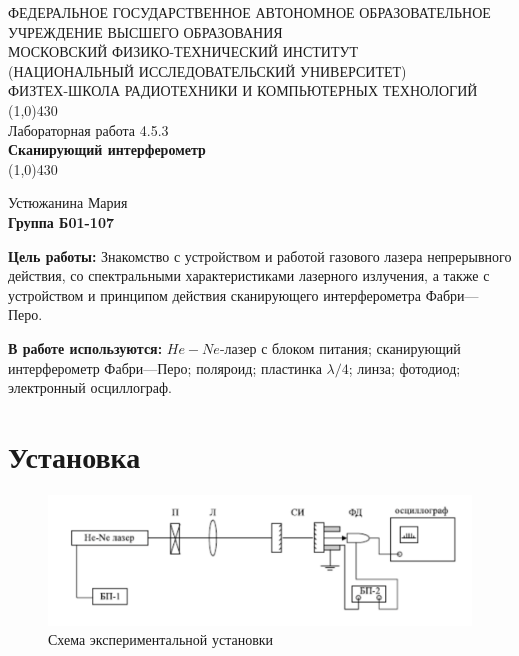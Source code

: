 \documentclass[11pt]{article}
\begin{document}
\begin{titlepage}
\begin{center}
\large{\small ФЕДЕРАЛЬНОЕ ГОСУДАРСТВЕННОЕ АВТОНОМНОЕ ОБРАЗОВАТЕЛЬНОЕ\\ УЧРЕЖДЕНИЕ ВЫСШЕГО ОБРАЗОВАНИЯ\\ МОСКОВСКИЙ ФИЗИКО-ТЕХНИЧЕСКИЙ ИНСТИТУТ\\ (НАЦИОНАЛЬНЫЙ ИССЛЕДОВАТЕЛЬСКИЙ УНИВЕРСИТЕТ)\\ ФИЗТЕХ-ШКОЛА РАДИОТЕХНИКИ И КОМПЬЮТЕРНЫХ ТЕХНОЛОГИЙ}
\vfill
\line(1,0){430}\\[1mm]
\huge{Лабораторная работа 4.5.3}\\
\huge\textbf{Сканирующий интерферометр}\\
\line(1,0){430}\\[1mm]
\vfill
\begin{flushright}
\normalsize{Устюжанина Мария}\\
\normalsize{\textbf{Группа Б01-107}}\\
\end{flushright}
\end{center}
\end{titlepage}

\par \textbf{Цель работы:} Знакомство с устройством и работой газового лазера непрерывного действия, со спектральными характеристиками лазерного излучения, а также с устройством и принципом действия сканирующего интерферометра Фабри—Перо.


\par \textbf{В работе используются:} 
\(He-Ne\)-лазер с блоком питания; сканирующий интерферометр Фабри—Перо; поляроид; пластинка \(\lambda / 4\); линза;
фотодиод; электронный осциллограф.


\section{Установка}

\begin{figure}[H]
  \centering
  \includegraphics[width=\textwidth]{1.png}
  \caption{Схема экспериментальной установки}
  \label{fig:device}
\end{figure}
\end{document}
